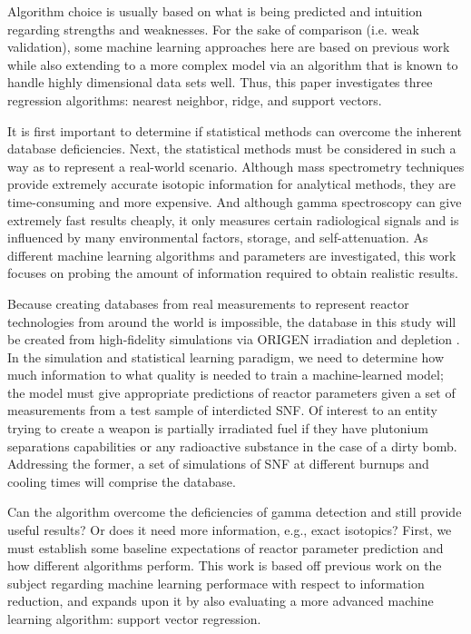 Algorithm choice is usually based on what is being predicted and intuition
regarding strengths and weaknesses.  For the sake of comparison (i.e. weak
validation), some machine learning approaches here are based on previous work
\cite{dayman_feasibility_2013} while also extending to a more complex model
via an algorithm that is known to handle highly dimensional data sets well.
Thus, this paper investigates three regression algorithms: nearest neighbor,
ridge, and support vectors.


It is first important to determine if statistical methods can
overcome the inherent database deficiencies. Next, the statistical methods must
be considered in such a way as to represent a real-world scenario. Although
mass spectrometry techniques provide extremely accurate isotopic information
for analytical methods, they are time-consuming and more expensive. And
although gamma spectroscopy can give extremely fast results cheaply, it only
measures certain radiological signals and is influenced by many environmental
factors, storage, and self-attenuation. As different machine learning
algorithms and parameters are investigated, this work focuses on probing the
amount of information required to obtain realistic results.

Because creating databases from real measurements to represent reactor
technologies from around the world is impossible, the database in this study
will be created from high-fidelity simulations via ORIGEN irradiation and
depletion . In the simulation and
statistical learning paradigm, we need to determine how much information to
what quality is needed to train a machine-learned model; the model must give
appropriate predictions of reactor parameters given a set of measurements from
a test sample of interdicted \gls{SNF}. Of interest to an entity trying to
create a weapon is partially irradiated fuel if they have plutonium separations
capabilities or any radioactive substance in the case of a dirty bomb.
Addressing the former, a set of simulations of \gls{SNF} at different burnups
and cooling times will comprise the database.

Can the algorithm overcome the deficiencies of gamma detection and still
provide useful results? Or does it need more information, e.g., exact
isotopics? First, we must establish some baseline expectations of reactor
parameter prediction and how different algorithms perform. This work is based
off previous work on the subject \cite{dayman_feasibility_2013} regarding
machine learning performace with respect to information reduction, and expands
upon it by also evaluating a more advanced machine learning algorithm: support
vector regression. 



